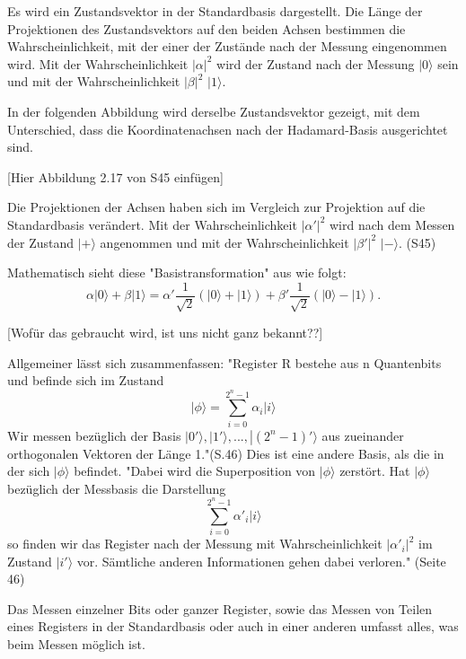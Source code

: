 Es wird ein Zustandsvektor in der Standardbasis dargestellt. Die Länge der Projektionen des Zustandsvektors auf den beiden Achsen bestimmen die Wahrscheinlichkeit, mit der einer der Zustände nach der Messung eingenommen wird. Mit der Wahrscheinlichkeit $\left|\alpha\right|^2$ wird der Zustand nach der Messung $\left|0\right.\rangle$ sein und mit der Wahrscheinlichkeit $\left|\beta\right|^2$ $\left|1\right.\rangle$. 

In der folgenden Abbildung wird derselbe Zustandsvektor gezeigt, mit dem Unterschied, dass die Koordinatenachsen nach der Hadamard-Basis ausgerichtet sind.

[Hier Abbildung 2.17 von S45 einfügen]

Die Projektionen der Achsen haben sich im Vergleich zur Projektion auf die Standardbasis verändert. Mit der Wahrscheinlichkeit $\left|\alpha'\right|^2$ wird nach dem Messen der Zustand $\left|+\right.\rangle$ angenommen und mit der Wahrscheinlichkeit $\left|\beta'\right|^2$ $\left|-\right.\rangle$. (S45) 

Mathematisch sieht diese "Basistransformation" aus wie folgt:
$$\alpha\left|0\right.\rangle+\beta\left|1\right.\rangle=\alpha'\frac{1}{\sqrt{2}}\left(\left|0\right.\rangle+\left|1\right.\rangle\right)+\beta'\frac{1}{\sqrt{2}}\left(\left|0\right.\rangle-\left|1\right.\rangle\right).$$

[Wofür das gebraucht wird, ist uns nicht ganz bekannt??]



Allgemeiner lässt sich zusammenfassen: "Register R bestehe aus n Quantenbits und befinde sich im Zustand
$$\left|\phi\right.\rangle=\sum_{i=0}^{2^n-1}\alpha_i\left|i\right.\rangle$$
Wir messen bezüglich der Basis
$\left|0'\right.\rangle,\left|1'\right.\rangle,...,\left|(2^n-1)'\right.\rangle$
aus zueinander orthogonalen Vektoren der Länge 1."(S.46) Dies ist eine andere Basis, als die in der sich $\left|\phi\right.\rangle$ befindet. "Dabei wird die Superposition von $\left|\phi\right.\rangle$ zerstört. Hat $\left|\phi\right.\rangle$ bezüglich der Messbasis die Darstellung
$$\sum_{i=0}^{2^n-1}\alpha'_i\left|i\right.\rangle$$
so finden wir das Register nach der Messung mit Wahrscheinlichkeit $\left|\alpha'_i\right|^2$ im Zustand $\left|i'\right.\rangle$ vor.  Sämtliche anderen Informationen gehen dabei
verloren." (Seite 46)

Das Messen einzelner Bits oder ganzer Register, sowie das Messen von Teilen eines Registers in der Standardbasis oder auch in einer anderen umfasst alles, was beim Messen möglich ist.

